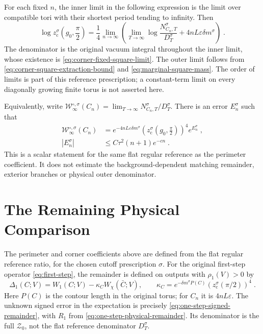 \documentclass[11pt]{article}
\begin{document}
For each fixed $n$, the inner limit in the following expression is the limit over compatible tori with their shortest period tending to infinity. Then
\begin{equation}\label{eq:corner-ratio-limit}
    \boxed{\displaystyle
        \log z_{\mathrm c}^{\sigma}\!\left(g_0,\frac{\pi}{2}\right)
            =\frac{1}{4}\lim_{n\to\infty}
                \left(\lim_{T\to\infty}
                    \log\frac{N_{C_n,T}^{\sigma}}{D_T^{\sigma}}
                    +4nL\varepsilon\delta m^{\sigma}\right)}\;.
\end{equation}
The denominator is the original vacuum integral throughout the inner limit, whose existence is \eqref{eq:corner-fixed-square-limit}. The outer limit follows from \eqref{eq:corner-square-extraction-bound} and \eqref{eq:marginal-square-mass}. The order of limits is part of this reference prescription; a constant-term limit on every diagonally growing finite torus is not asserted here.

Equivalently, write $\mathcal W_\infty^{\circ,\sigma}(C_n)=\lim_{T\to\infty}N_{C_n,T}^{\sigma}/D_T^{\sigma}$. There is an error $E_n^{\sigma}$ such that
\begin{equation}\label{eq:corner-reference-matching}
    \begin{aligned}
        \mathcal W_\infty^{\circ,\sigma}(C_n)
            &=e^{-4nL\varepsilon\delta m^{\sigma}}
                \left(z_{\mathrm c}^{\sigma}
                    \!\left(g_0,\frac{\pi}{2}\right)\right)^4
                e^{E_n^{\sigma}}\;,\\
        |E_n^{\sigma}|&\leq C\tau^2(n+1)e^{-cn}\;.
    \end{aligned}
\end{equation}
This is a scalar statement for the same flat regular reference as the perimeter coefficient. It does not estimate the background-dependent matching remainder, exterior branches or physical outer denominator.

\section{The Remaining Physical Comparison}
\label{sec:remaining-physical-comparison}

The perimeter and corner coefficients above are defined from the flat regular reference ratio, for the chosen cutoff prescription $\sigma$. For the original first-step operator \eqref{eq:first-step}, the remainder is defined on outputs with $\rho_1(V)>0$ by
\begin{equation}\label{eq:remainder}
    \Delta_1(C;V)=W_1(C;V)
        -\kappa_CW_\chi(\bar C;V),
    \qquad \kappa_C=e^{-\delta m^\sigma P(C)}
        \left(z_{\mathrm c}^\sigma(\pi/2)\right)^4\;.
\end{equation}
Here $P(C)$ is the contour length in the original torus; for $C_n$ it is $4nL\varepsilon$. The unknown signed error in the expectation is precisely \eqref{eq:one-step-signed-remainder}, with $R_1$ from \eqref{eq:one-step-physical-remainder}. Its denominator is the full $\mathcal Z_0$, not the flat reference denominator $D_T^\sigma$.
\end{document}
